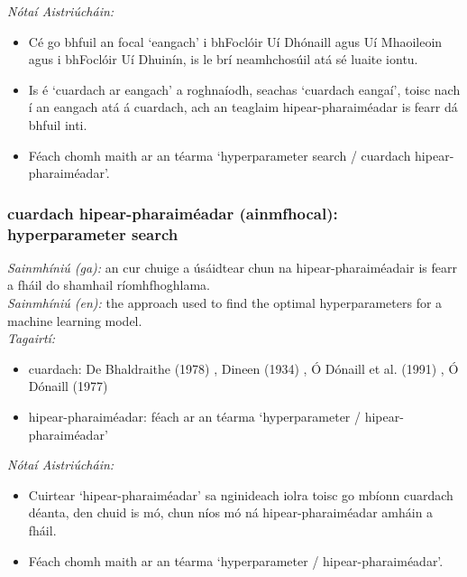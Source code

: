 \documentclass{article}
\begin{document}
 \noindent \textit{Nótaí Aistriúcháin:}
\begin{itemize}
	\item Cé go bhfuil an focal `eangach' i bhFoclóir Uí Dhónaill agus Uí Mhaoileoin agus i bhFoclóir Uí Dhuinín, is le brí neamhchosúil atá sé luaite iontu.
	\item Is é `cuardach ar eangach' a roghnaíodh, seachas `cuardach eangaí', toisc nach í an eangach atá á cuardach, ach an teaglaim hipear-pharaiméadar is fearr dá bhfuil inti.
	\item Féach chomh maith ar an téarma `hyperparameter search / cuardach hipear-pharaiméadar'.
\end{itemize}


\subsubsection*{cuardach hipear-pharaiméadar (ainmfhocal): hyperparameter search}
 \noindent \textit{Sainmhíniú (ga):} an cur chuige a úsáidtear chun na hipear-pharaiméadair is fearr a fháil do shamhail ríomhfhoghlama.
\\
 \noindent \textit{Sainmhíniú (en):} the approach used to find the optimal hyperparameters for a machine learning model.
\\
 \noindent \textit{Tagairtí:}
\begin{itemize}
	\item cuardach: De Bhaldraithe (1978) \cite{de-bhaldraithe}, Dineen (1934) \cite{dineen}, Ó Dónaill et al. (1991) \cite{focloir-beag}, Ó Dónaill (1977) \cite{odonaill}
	\item hipear-pharaiméadar: féach ar an téarma `hyperparameter / hipear-pharaiméadar'
\end{itemize}

 \noindent \textit{Nótaí Aistriúcháin:}
\begin{itemize}
	\item Cuirtear `hipear-pharaiméadar' sa nginideach iolra toisc go mbíonn cuardach déanta, den chuid is mó, chun níos mó ná hipear-pharaiméadar amháin a fháil.
	\item Féach chomh maith ar an téarma `hyperparameter / hipear-pharaiméadar'.
\end{itemize}
\end{document}

